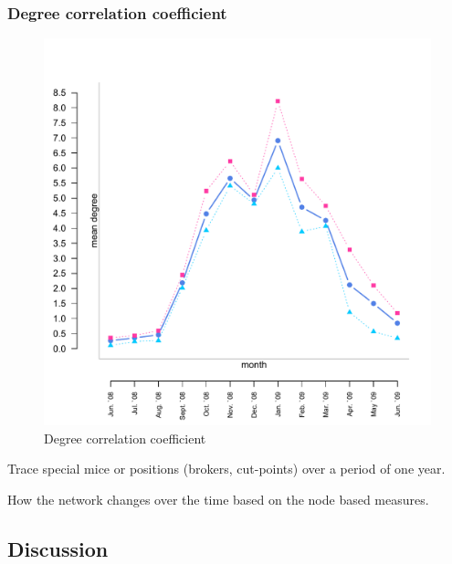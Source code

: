 \subsubsection*{Degree correlation coefficient}

\begin{figure}[htpb]
\begin{center}
  \includegraphics[width=.6\textwidth]{assets/pdf/long_degree.pdf}
  \caption[Degree correlation coefficient]{Degree correlation coefficient}
  \label{fig:long_degree_cor}
\end{center}
\end{figure} 


\begin{mylist}
\item Trace special mice or positions (brokers, cut-points) over a period of one year.
\item How the network changes over the time based on the node based measures.
\end{mylist} 

\subsection{Discussion}
\label{subsec:discussion}


